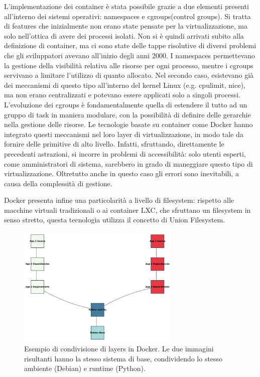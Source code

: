 L'implementazione dei container è stata possibile grazie a due elementi presenti all'interno dei sistemi operativi: namespaces e cgroups(control groups). Si tratta di features che inizialmente non erano state pensate per la virtualizzazione, ma solo nell'ottica di avere dei processi isolati. Non si è quindi arrivati subito alla definizione di container, ma ci sono state delle tappe risolutive di diversi problemi che gli sviluppatori avevano all'inizio degli anni 2000. I namespaces permettevano la gestione della visibilità relativa alle risorse per ogni processo, mentre i cgroups servivano a limitare l'utilizzo di quanto allocato. Nel secondo caso, esistevano già dei meccanismi di questo tipo all'interno del kernel Linux (e.g. cpulimit, nice), ma non erano centralizzati e potevano essere applicati solo a singoli processi. L'evoluzione dei cgroups è fondamentalmente quella di estendere il tutto ad un gruppo di task in maniera modulare, con la possibilità di definire delle gerarchie nella gestione delle risorse. Le tecnologie basate su container come Docker hanno integrato questi meccanismi nel loro layer di virtualizzazione, in modo tale da fornire delle primitive di alto livello. Infatti, sfruttando, direttamente le precedenti astrazioni, si incorre in problemi di accessibilità: solo utenti esperti, come amministratori di sistema, sarebbero in grado di maneggiare questo tipo di virtualizzazione. Oltretutto anche in questo caso gli errori sono inevitabili, a causa della complessità di gestione. 

Docker presenta infine una particolarità a livello di filesystem: rispetto alle macchine virtuali tradizionali o ai container LXC, che sfruttano un filesystem in senso stretto, questa tecnologia utilizza il concetto di Union Filesystem. 

\begin{figure}[htbp]
    \centering
    \includegraphics[width=0.69\textwidth]{figures/docker-image-layers.png}
    \caption{Esempio di condivisione di layers in Docker. Le due immagini risultanti hanno la stesso sistema di base, condividendo lo stesso ambiente (Debian) e runtime (Python).}
    \label{fig:image-layers}
\end{figure}

